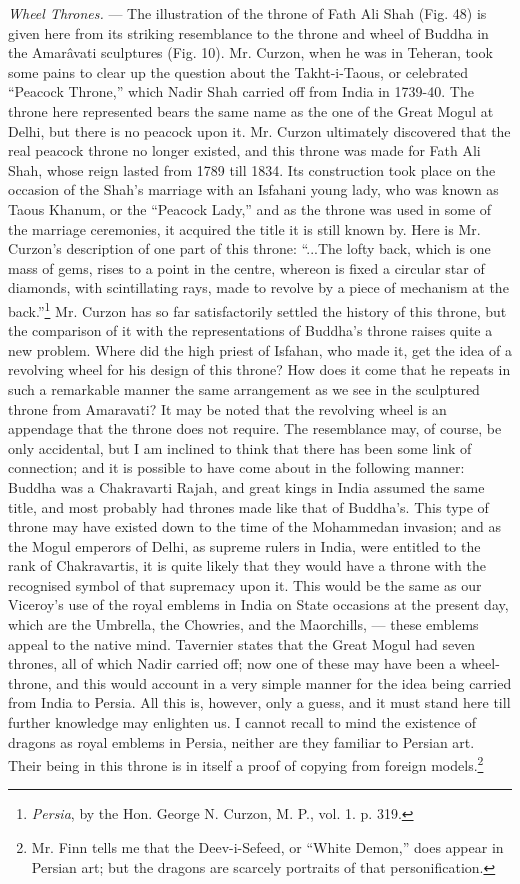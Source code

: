 \documentclass[a4paper, 11pt, oneside, polutonikogreek, english]{article}
\begin{document}
\emph{Wheel Thrones.} --- The illustration of the throne of Fath Ali Shah (Fig. 48) is given here from its striking resemblance to the throne and wheel of Buddha in the Amarâvati sculptures (Fig. 10). Mr. Curzon, when he was in Teheran, took some pains to clear up the question about the Takht-i-Taous, or celebrated ``Peacock Throne,'' which Nadir Shah carried off from India in 1739-40. The throne here represented bears the same name as the one of the Great Mogul at Delhi, but there is no peacock upon it. Mr. Curzon ultimately discovered that the real peacock throne no longer existed, and this throne was made for Fath Ali Shah, whose reign lasted from 1789 till 1834. Its construction took place on the occasion of the Shah's marriage with an Isfahani young lady, who was known as Taous Khanum, or the ``Peacock Lady,'' and as the throne was used in some of the marriage ceremonies, it acquired the title it is still known by. Here is Mr. Curzon's description of one part of this throne: ``...The lofty back, which is one mass of gems, rises to a point in the centre, whereon is fixed a circular star of diamonds, with scintillating rays, made to revolve by a piece of mechanism at the back.''\footnote{\emph{Persia}, by the Hon. George N. Curzon, M. P., vol. 1. p. 319.} Mr. Curzon has so far satisfactorily settled the history of this throne, but the comparison of it with the representations of Buddha's throne raises quite a new problem. Where did the high priest of Isfahan, who made it, get the idea of a revolving wheel for his design of this throne? How does it come that he repeats in such a remarkable manner the same arrangement as we see in the sculptured throne from Amaravati? It may be noted that the revolving wheel is an appendage that the throne does not require. The resemblance may, of course, be only accidental, but I am inclined to think that there has been some link of connection; and it is possible to have come about in the following manner: Buddha was a Chakravarti Rajah, and great kings in India assumed the same title, and most probably had thrones made like that of Buddha's. This type of throne may have existed down to the time of the Mohammedan invasion; and as the Mogul emperors of Delhi, as supreme rulers in India, were entitled to the rank of Chakravartis, it is quite likely that they would have a throne with the recognised symbol of that supremacy upon it. This would be the same as our Viceroy's use of the royal emblems in India on State occasions at the present day, which are the Umbrella, the Chowries, and the Maorchills, --- these emblems appeal to the native mind. Tavernier states that the Great Mogul had seven thrones, all of which Nadir carried off; now one of these may have been a wheel-throne, and this would account in a very simple manner for the idea being carried from India to Persia. All this is, however, only a guess, and it must stand here till further knowledge may enlighten us. I cannot recall to mind the existence of dragons as royal emblems in Persia, neither are they familiar to Persian art. Their being in this throne is in itself a proof of copying from foreign models.\footnote{Mr. Finn tells me that the Deev-i-Sefeed, or ``White Demon,'' does appear in Persian art; but the dragons are scarcely portraits of that personification.}
\end{document}
